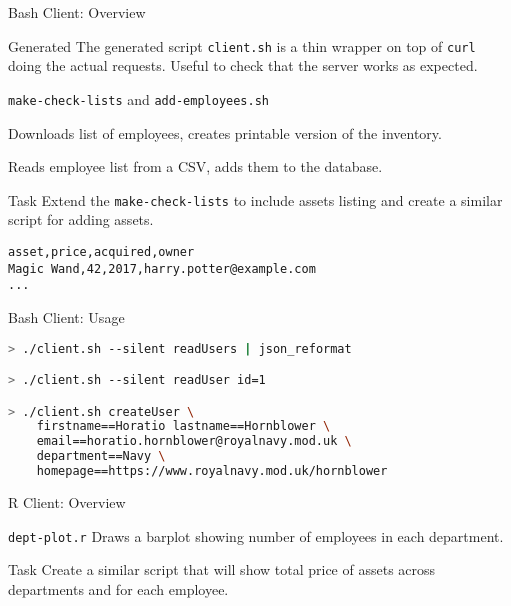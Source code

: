 \begin{frame}[fragile]{Bash Client: Overview}
    \begin{block}{Generated}
        The generated script \lstinline{client.sh} is a thin wrapper on top of \lstinline{curl} doing the actual requests. Useful to check that the server works as expected.
    \end{block}

    \begin{block}{\lstinline{make-check-lists} and \lstinline{add-employees.sh}}

        Downloads list of employees, creates printable version of the inventory.

        Reads employee list from a CSV, adds them to the database.
    \end{block}

    \begin{block}{Task}
        Extend the \lstinline{make-check-lists} to include assets listing and create a similar script for adding assets.

\begin{lstlisting}
asset,price,acquired,owner
Magic Wand,42,2017,harry.potter@example.com
...
\end{lstlisting}
    \end{block}
\end{frame}


\begin{frame}[fragile]{Bash Client: Usage}
\begin{lstlisting}[language=bash]
> ./client.sh --silent readUsers | json_reformat

> ./client.sh --silent readUser id=1

> ./client.sh createUser \
    firstname==Horatio lastname==Hornblower \
    email==horatio.hornblower@royalnavy.mod.uk \
    department==Navy \
    homepage==https://www.royalnavy.mod.uk/hornblower
\end{lstlisting}
\end{frame}


\begin{frame}[fragile]{R Client: Overview}
    \begin{block}{\lstinline{dept-plot.r}}
        Draws a barplot showing number of employees in each department.
    \end{block}

    \begin{block}{Task}
        Create a similar script that will show total price of
        assets across departments and for each employee.
    \end{block}
\end{frame}


